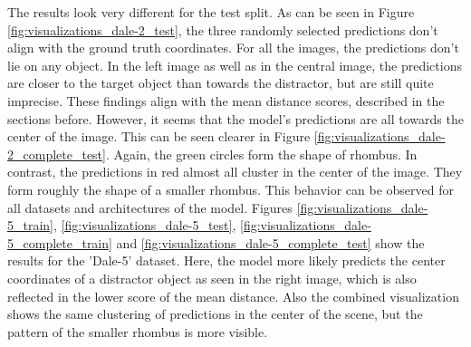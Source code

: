 The results look very different for the test split.
As can be seen in Figure \ref{fig:visualizations_dale-2_test}, the three randomly selected predictions don't align with the ground truth coordinates.
For all the images, the predictions don't lie on any object.
In the left image as well as in the central image, the predictions are closer to the target object than towards the distractor, but are still quite imprecise.
These findings align with the mean distance scores, described in the sections before.
However, it seems that the model's predictions are all towards the center of the image.
This can be seen clearer in Figure \ref{fig:visualizations_dale-2_complete_test}.
Again, the green circles form the shape of rhombus.
In contrast, the predictions in red almost all cluster in the center of the image.
They form roughly the shape of a smaller rhombus.
This behavior can be observed for all datasets and architectures of the model.
Figures \ref{fig:visualizations_dale-5_train}, \ref{fig:visualizations_dale-5_test}, \ref{fig:visualizations_dale-5_complete_train} and \ref{fig:visualizations_dale-5_complete_test} show the results for the 'Dale-5' dataset.
Here, the model more likely predicts the center coordinates of a distractor object as seen in the right image, which is also reflected in the lower score of the mean distance.
Also the combined visualization shows the same clustering of predictions in the center of the scene, but the pattern of the smaller rhombus is more visible.

